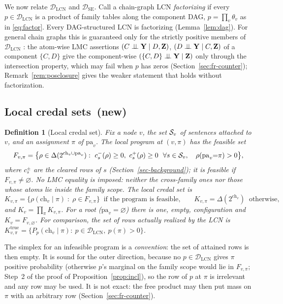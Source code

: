 \documentclass{article} %
\DeclareRobustCommand{\rev}[1]{{\color{blue}#1}}
\newcommand{\newtag}{\texorpdfstring{~\rev{(new)}}{}}
\newtheorem{definition}{Definition}
\newcommand{\indep}{\perp\!\!\!\perp}
\newcommand{\DSE}{\mathcal{D}_{\mathrm{SE}}}
\newcommand{\DLCN}{\mathcal{D}_{\mathrm{LCN}}}
\newcommand{\ch}{\mathrm{ch}}
\newcommand{\pa}{\mathrm{pa}}
\begin{document}
We now relate $\DLCN$ and $\DSE$. Call a chain-graph LCN \emph{factorizing} if every
$p\in\DLCN$ is a product of family tables along the component DAG,
$p=\prod_v\theta_v$ as in \eqref{eq:factor}. Every DAG-structured LCN is factorizing
(Lemma~\ref{lem:dag}). For general chain graphs this is guaranteed only for the strictly positive
members of $\DLCN$ \citep{cozman23a}: the atom-wise LMC assertions
$(C\indep\bY\mid D,\bZ)$, $(D\indep\bY\mid C,\bZ)$ of a component $\{C,D\}$ give the
component-wise $(\{C,D\}\indep\bY\mid\bZ)$ only through the intersection property, which may fail
when $p$ has zeros (Section~\ref{sec:fr-counter}); Remark~\ref{rem:posclosure} gives the weaker
statement that holds without factorization.

\subsection{Local credal sets\newtag}

\begin{definition}[Local credal set]\label{def:localset}
Fix a node $v$, the set $\mathcal{S}_v$ of sentences attached to $v$, and an assignment $\pi$ of $\pa_v$. The
\emph{local program} at $(v,\pi)$ has the feasible set
\[
  F_{v,\pi}=\bigl\{\rho\in\Delta(2^{\ch_v\cup\pa_v}):\ c_s^-(\rho)\ge0,\ c_s^+(\rho)\ge0\ \ \forall s\in\cS_v,\quad
  \rho(\pa_v{=}\pi)>0\bigr\},
\]
where $c_s^\pm$ are the cleared rows of $s$ (Section~\ref{sec-background}); it is \emph{feasible} if
$F_{v,\pi}\ne\varnothing$. No LMC equality is imposed: neither the cross-family ones nor those whose
atoms lie inside the family scope. The \emph{local credal set} is
\[
  K_{v,\pi}=\bigl\{\rho(\ch_v\mid\pi)\;:\;\rho\in F_{v,\pi}\bigr\}\ \text{ if the program is feasible,}\qquad
  K_{v,\pi}=\Delta(2^{\ch_v})\ \text{ otherwise},
\]
and $K_v=\prod_\pi K_{v,\pi}$. For a root ($\pa_v=\varnothing$) there is one, empty, configuration and
$K_v=F_{v,\varnothing}$. For comparison, the set of rows actually realized by the LCN is
$K^{\mathrm{true}}_{v,\pi}=\{P_p(\ch_v\mid\pi):\ p\in\DLCN,\ p(\pi)>0\}$.
\end{definition}

The simplex for an infeasible program is a \emph{convention}: the set of attained rows is then
empty. It is sound for the outer direction, because no $p\in\DLCN$ gives $\pi$ positive probability
(otherwise $p$'s marginal on the family scope would lie in $F_{v,\pi}$; Step~2 of the proof of
Proposition~\ref{prop:incl}), so the row of $p$ at $\pi$ is irrelevant and any row may be used. It is
not exact: the free product may then put mass on $\pi$ with an arbitrary row
(Section~\ref{sec:fr-counter}).
\end{document}
